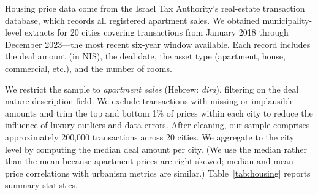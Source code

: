 \documentclass[12pt,a4paper]{article}
\begin{document}
Housing price data come from the Israel Tax Authority's real-estate transaction
database, which records all registered apartment sales.  We obtained
municipality-level extracts for 20 cities covering transactions from January
2018 through December 2023—the most recent six-year window available.  Each
record includes the deal amount (in NIS), the deal date, the asset type
(apartment, house, commercial, etc.), and the number of rooms.

We restrict the sample to \textit{apartment sales} (Hebrew: \textit{dira}),
filtering on the deal nature description field.  We exclude transactions with
missing or implausible amounts and trim the top and bottom 1\% of prices within
each city to reduce the influence of luxury outliers and data errors.  After
cleaning, our sample comprises approximately 200,000 transactions across 20
cities.  We aggregate to the city level by computing the median deal amount
per city.  (We use the median rather than the mean because apartment prices are
right-skewed; median and mean price correlations with urbanism metrics are
similar.)  Table~\ref{tab:housing} reports summary statistics.
\end{document}
